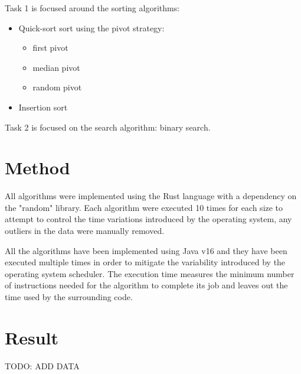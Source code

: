 \documentclass{article}
\begin{document}
Task 1 is focused around the sorting algorithms:
\begin{itemize}
	\item Quick-sort sort using the pivot strategy:
	\begin{itemize}
	    \item first pivot
	    \item median pivot
	    \item random pivot
	\end{itemize}
	\item Insertion sort
\end{itemize}

Task 2 is focused on the search algorithm: binary search. 

\section{Method}
All algorithms were implemented using the Rust language with a dependency on the "random" library. Each algorithm were executed 10 times for each size to attempt to control the time variations introduced by the operating system, any outliers in the data were manually removed. 

All the algorithms have been implemented using Java v16 and they have been executed multiple times in order to mitigate the variability introduced by the operating system scheduler.
The execution time measures the minimum number of instructions needed for the algorithm to complete its job and leaves out the time used by the surrounding code.

\newpage
\section{Result}

TODO: ADD DATA
\end{document}
